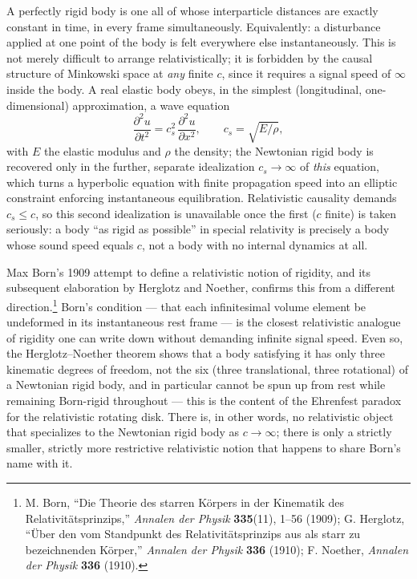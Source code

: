 \documentclass[11pt]{book}
\newcommand{\pdv}[2]{\dfrac{\partial #1}{\partial #2}}
\begin{document}
A perfectly rigid body is one all of whose interparticle distances are exactly constant in time, in every frame simultaneously. Equivalently: a disturbance applied at one point of the body is felt everywhere else instantaneously. This is not merely difficult to arrange relativistically; it is forbidden by the causal structure of Minkowski space at \emph{any} finite $c$, since it requires a signal speed of $\infty$ inside the body. A real elastic body obeys, in the simplest (longitudinal, one-dimensional) approximation, a wave equation
\begin{equation}
\pdv{^2 u}{t^2} = c_s^2\, \pdv{^2 u}{x^2}, \qquad c_s = \sqrt{E/\rho},
\end{equation}
with $E$ the elastic modulus and $\rho$ the density; the Newtonian rigid body is recovered only in the further, separate idealization $c_s\to\infty$ of \emph{this} equation, which turns a hyperbolic equation with finite propagation speed into an elliptic constraint enforcing instantaneous equilibration. Relativistic causality demands $c_s \le c$, so this second idealization is unavailable once the first ($c$ finite) is taken seriously: a body ``as rigid as possible'' in special relativity is precisely a body whose sound speed equals $c$, not a body with no internal dynamics at all.

Max Born's 1909 attempt to define a relativistic notion of rigidity, and its subsequent elaboration by Herglotz and Noether, confirms this from a different direction.\footnote{M. Born, ``Die Theorie des starren K\"orpers in der Kinematik des Relativit\"atsprinzips,'' \emph{Annalen der Physik} \textbf{335}(11), 1--56 (1909); G. Herglotz, ``\"Uber den vom Standpunkt des Relativit\"atsprinzips aus als starr zu bezeichnenden K\"orper,'' \emph{Annalen der Physik} \textbf{336} (1910); F. Noether, \emph{Annalen der Physik} \textbf{336} (1910).} Born's condition --- that each infinitesimal volume element be undeformed in its instantaneous rest frame --- is the closest relativistic analogue of rigidity one can write down without demanding infinite signal speed. Even so, the Herglotz--Noether theorem shows that a body satisfying it has only three kinematic degrees of freedom, not the six (three translational, three rotational) of a Newtonian rigid body, and in particular cannot be spun up from rest while remaining Born-rigid throughout --- this is the content of the Ehrenfest paradox for the relativistic rotating disk. There is, in other words, no relativistic object that specializes to the Newtonian rigid body as $c\to\infty$; there is only a strictly smaller, strictly more restrictive relativistic notion that happens to share Born's name with it.
\end{document}
